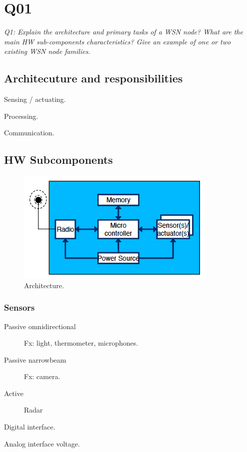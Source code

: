 \chapter{Q01}
\emph{Q1: Explain the architecture and primary tasks of a WSN node? What are
the main HW sub-components characteristics? Give an example of one or two
existing WSN node families.}

\section{Architecuture and responsibilities}

\begin{description}
\item Sensing / actuating.
\item Processing.
\item Communication.
\end{description}

\section{HW Subcomponents}

\begin{figure}[h]
  \centering
  \includegraphics[scale=0.5]{img/moteAnatomy.png}
  \caption{Architecture.}
\end{figure}

\subsection{Sensors}
\begin{description}
\item[Passive omnidirectional] Fx: light, thermometer, microphones.
\item[Passive narrowbeam] Fx: camera.
\item[Active] Radar
\end{description}

\begin{description}
\item Digital interface.
\item Analog interface voltage.
\end{description}

